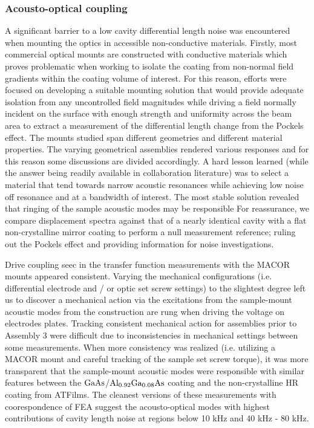 \subsubsection{Acousto-optical coupling}
A significant barrier to a low cavity differential length noise was encountered when mounting the optics in accessible non-conductive materials. Firstly, most commercial optical mounts are constructed with conductive materials which proves problematic when working to isolate the coating from non-normal field gradients within the coating volume of interest. For this reason, efforts were focused on developing a suitable mounting solution that would provide adequate isolation from any uncontrolled field magnitudes while driving a field normally incident on the surface with enough strength and uniformity across the beam area to extract a measurement of the differential length change from the Pockels effect. The mounts studied span different geometries and different material properties. The varying geometrical assemblies rendered various responses and for this reason some discussions are divided accordingly. A hard lesson learned (while the answer being readily available in collaboration literature) was to select a material that tend towards narrow acoustic resonances while achieving low noise off resonance and at a bandwidth of interest. The most stable solution revealed that ringing of the sample acoustic modes may be responsible For reassurance, we compare displacement spectra against that of a nearly identical cavity with a flat non-crystalline mirror coating to perform a null measurement reference; ruling out the Pockels effect and providing information for noise investigations.


Drive coupling seec in the transfer function measurements with the MACOR mounts appeared consistent. Varying the mechanical configurations (i.e. differential electrode and / or optic set screw settings) to the slightest degree left us to discover a mechanical action via the excitations from the sample-mount acoustic modes from the construction are rung when driving the voltage on electrodes plates. Tracking consistent mechanical action for assemblies prior to Assembly 3 were difficult due to inconsistencies in mechanical settings between some measurements. When more consistency was realized (i.e. utilizing a MACOR mount and careful tracking of the sample set screw torque), it was more transparent that the sample-mount acoustic modes were responsible with similar features between the $\mathrm{GaAs}$/$\mathrm{Al_{0.92}Ga_{0.08}As}$ coating and the non-crystalline HR coating from ATFilms. The cleanest versions of these measurements with coorespondence of FEA suggest the acousto-optical modes with highest contributions of cavity length noise at regions below 10 kHz and 40 kHz - 80 kHz. 

